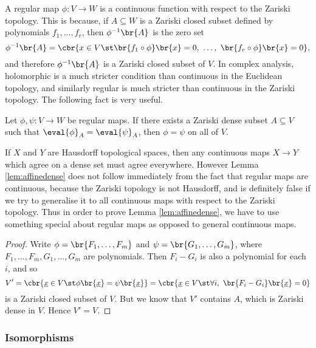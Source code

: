 A regular map $ \phi : V \to W $ is a continuous function with respect to the Zariski topology. This is because, if $ A \subseteq W $ is a Zariski closed subset defined by polynomials $ f_1, \dots, f_r $, then $ \phi^{-1}\br{A} $ is the zero set
$$ \phi^{-1}\br{A} = \cbr{x \in V \st \br{f_1 \circ \phi}\br{x} = 0, \ \dots, \ \br{f_r \circ \phi}\br{x} = 0}, $$
and therefore $ \phi^{-1}\br{A} $ is a Zariski closed subset of $ V $. In complex analysis, holomorphic is a much stricter condition than continuous in the Euclidean topology, and similarly regular is much stricter than continuous in the Zariski topology. The following fact is very useful.

\begin{lemma}
\label{lem:affinedense}
Let $ \phi, \psi : V \to W $ be regular maps. If there exists a Zariski dense subset $ A \subseteq V $ such that $ \eval{\phi}_A = \eval{\psi}_A $, then $ \phi = \psi $ on all of $ V $.
\end{lemma}

\begin{note*}
If $ X $ and $ Y $ are Hausdorff topological spaces, then any continuous maps $ X \to Y $ which agree on a dense set must agree everywhere. However Lemma \ref{lem:affinedense} does not follow immediately from the fact that regular maps are continuous, because the Zariski topology is not Hausdorff, and is definitely false if we try to generalise it to all continuous maps with respect to the Zariski topology. Thus in order to prove Lemma \ref{lem:affinedense}, we have to use something special about regular maps as opposed to general continuous maps.
\end{note*}

\begin{proof}
Write $ \phi = \br{F_1, \dots, F_m} $ and $ \psi = \br{G_1, \dots, G_m} $, where $ F_1, \dots, F_m, G_1, \dots, G_m $ are polynomials. Then $ F_i - G_i $ is also a polynomial for each $ i $, and so
$$ V' = \cbr{\underline{x} \in V \st \phi\br{\underline{x}} = \psi\br{\underline{x}}} = \cbr{\underline{x} \in V \st \forall i, \ \br{F_i - G_i}\br{\underline{x}} = 0} $$
is a Zariski closed subset of $ V $. But we know that $ V' $ contains $ A $, which is Zariski dense in $ V $. Hence $ V' = V $.
\end{proof}

\subsubsection{Isomorphisms}

